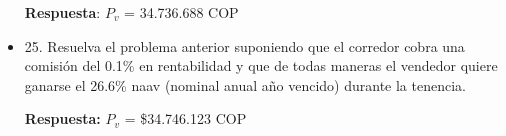 \begin{itemize}
       \textbf{Respuesta}: $P_{v}$ = 34.736.688 COP\\
       \medskip

 \item 25. Resuelva el problema anterior suponiendo que el corredor cobra una comisión del 0.1\% en rentabilidad y que de todas maneras el vendedor quiere ganarse el 26.6\% naav (nominal anual año vencido) durante la tenencia.
 
       \textbf{Respuesta:} $P_{v}$ = \$34.746.123 COP\\

\end{itemize}